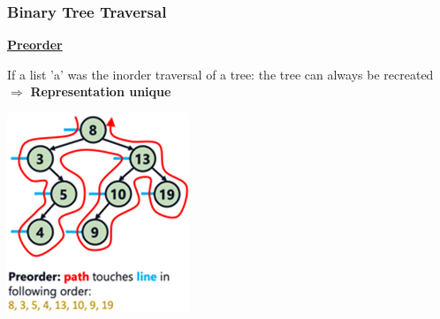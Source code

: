     \subsubsection{Binary Tree Traversal}
        {\centering\underline{\textbf{Preorder}} \par}
            \begin{minipage}{0.49\linewidth}
                
                If a list 'a' was the inorder traversal of a tree: the tree can always be recreated\\
                $\Rightarrow$ \textbf{Representation unique}
            \end{minipage}
            \begin{minipage}{0.49\linewidth}
                {\centering \includegraphics[width = 0.85\linewidth]{src/4_data_structure/images/preorder.png} \par}
            \end{minipage}


